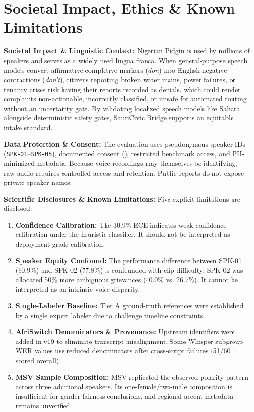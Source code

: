 \documentclass[9pt,a4paper]{extarticle}
\begin{document}
\section{Societal Impact, Ethics \& Known Limitations}
\label{sec:limitations}
\textbf{Societal Impact \& Linguistic Context:} Nigerian Pidgin is used by millions of speakers and serves as a widely used lingua franca. When general-purpose speech models convert affirmative completive markers (\textit{don}) into English negative contractions (\textit{don't}), citizens reporting broken water mains, power failures, or tenancy crises risk having their reports recorded as denials, which could render complaints non-actionable, incorrectly classified, or unsafe for automated routing without an uncertainty gate. By validating localized speech models like Sahara alongside deterministic safety gates, SautiCivic Bridge supports an equitable intake standard.

\textbf{Data Protection \& Consent:} The evaluation uses pseudonymous speaker IDs (\texttt{SPK-01}--\texttt{SPK-05}), documented consent (), restricted benchmark access, and PII-minimized metadata. Because voice recordings may themselves be identifying, raw audio requires controlled access and retention. Public reports do not expose private speaker names.

\textbf{Scientific Disclosures \& Known Limitations:} Five explicit limitations are disclosed:
\begin{enumerate}[leftmargin=*,itemsep=0.1pt,topsep=0.2pt,parsep=0pt]
  \item \textbf{Confidence Calibration:} The 30.9\% ECE indicates weak confidence calibration under the heuristic classifier. It should not be interpreted as deployment-grade calibration.
  \item \textbf{Speaker Equity Confound:} The performance difference between SPK-01 (90.9\%) and SPK-02 (77.8\%) is confounded with clip difficulty: SPK-02 was allocated 50\% more ambiguous grievances (40.0\% vs. 26.7\%). It cannot be interpreted as an intrinsic voice disparity.
  \item \textbf{Single-Labeler Baseline:} Tier A ground-truth references were established by a single expert labeler due to challenge timeline constraints.
  \item \textbf{AfriSwitch Denominators \& Provenance:} Upstream identifiers were added in v19 to eliminate transcript misalignment. Some Whisper subgroup WER values use reduced denominators after cross-script failures (51/60 scored overall).
  \item \textbf{MSV Sample Composition:} MSV replicated the observed polarity pattern across three additional speakers. Its one-female/two-male composition is insufficient for gender fairness conclusions, and regional accent metadata remains unverified.
\end{enumerate}
\end{document}

